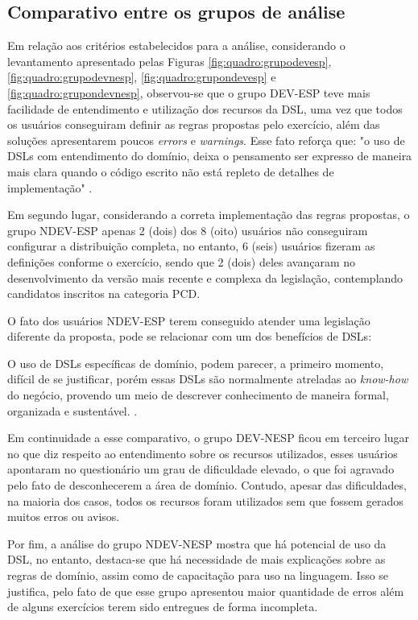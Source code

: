 \subsection{Comparativo entre os grupos de análise}
\label{sec:comparativogrupos}

Em relação aos critérios estabelecidos para a análise, considerando o levantamento apresentado pelas Figuras \ref{fig:quadro:grupodevesp}, \ref{fig:quadro:grupodevnesp}, \ref{fig:quadro:grupondevesp} e \ref{fig:quadro:grupondevnesp}, observou-se que o grupo DEV-ESP teve mais facilidade de entendimento e utilização dos recursos da DSL, uma vez que todos os usuários conseguiram definir as regras propostas pelo exercício, além das soluções apresentarem poucos \textit{errors} e \textit{warnings}. Esse fato reforça que: "o uso de DSLs com entendimento do domínio, deixa o pensamento ser expresso de maneira mais clara quando o código escrito não está repleto de detalhes de implementação" \cite[p.41, tradução nossa]{dslengineering}.

Em segundo lugar, considerando a correta implementação das regras propostas, o grupo NDEV-ESP apenas 2 (dois) dos 8 (oito) usuários não conseguiram configurar a distribuição completa, no entanto, 6 (seis) usuários fizeram as definições conforme o exercício, sendo que 2 (dois) deles avançaram no desenvolvimento da versão mais recente e complexa da legislação, contemplando candidatos inscritos na categoria PCD. 

O fato dos usuários NDEV-ESP terem conseguido atender uma legislação diferente da proposta, pode se relacionar com um dos benefícios de DSLs: 

\begin{citacao}
O uso de DSLs específicas de domínio, podem parecer, a primeiro momento, difícil de se justificar, porém essas DSLs são normalmente atreladas ao \textit{know-how} do negócio, provendo um meio de descrever conhecimento de maneira formal, organizada e sustentável. \cite[p.43, tradução nossa]{dslengineering}.
\end{citacao}

Em continuidade a esse comparativo, o grupo DEV-NESP ficou em terceiro lugar no que diz respeito ao entendimento sobre os recursos utilizados, esses usuários apontaram no questionário um grau de dificuldade elevado, o que foi agravado pelo fato de desconhecerem a área de domínio. Contudo, apesar das dificuldades, na maioria dos casos, todos os recursos foram utilizados sem que fossem gerados muitos erros ou avisos. 

Por fim, a análise do grupo NDEV-NESP mostra que há potencial de uso da DSL, no entanto, destaca-se que há necessidade de mais explicações sobre as regras de domínio, assim como de capacitação para uso na linguagem. Isso se justifica, pelo fato de que esse grupo apresentou maior quantidade de erros além de alguns exercícios terem sido entregues de forma incompleta.


